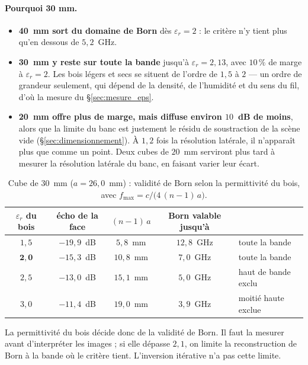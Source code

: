 \documentclass[11pt,a4paper]{article}
\newcommand{\eps}{\varepsilon_r}
\begin{document}
\paragraph{Pourquoi 30 mm.}
\begin{itemize}
\item \textbf{40~mm sort du domaine de Born} dès $\eps = 2$ : le critère n'y
      tient plus qu'en dessous de $5{,}2$~GHz.
\item \textbf{30~mm y reste sur toute la bande} jusqu'à $\eps = 2{,}13$, avec
      $10\,\%$ de marge à $\eps = 2$. Les bois légers et secs se situent de
      l'ordre de $1{,}5$ à $2$ --- un ordre de grandeur seulement, qui dépend de
      la densité, de l'humidité et du sens du fil, d'où la mesure du
      \S\ref{sec:mesure_eps}.
\item \textbf{20~mm offre plus de marge, mais diffuse environ $10$~dB de moins},
      alors que la limite du banc est justement le résidu de soustraction de la
      scène vide (\S\ref{sec:dimensionnement}). À $1{,}2$ fois la résolution
      latérale, il n'apparaît plus que comme un point. Deux cubes de $20$~mm
      serviront plus tard à mesurer la résolution latérale du banc, en faisant
      varier leur écart.
\end{itemize}

\begin{table}[H]
\centering
\begin{tabular}{ccccl}
\toprule
$\eps$ du bois & écho de la face & $(n-1)\,a$ & Born valable jusqu'à & \\
\midrule
$1{,}5$ & $-19{,}9$~dB & $5{,}8$~mm & $12{,}8$~GHz & toute la bande \\
$\mathbf{2{,}0}$ & $-15{,}3$~dB & $10{,}8$~mm & $7{,}0$~GHz & toute la bande \\
$2{,}5$ & $-13{,}0$~dB & $15{,}1$~mm & $5{,}0$~GHz & haut de bande exclu \\
$3{,}0$ & $-11{,}4$~dB & $19{,}0$~mm & $3{,}9$~GHz & moitié haute exclue \\
\bottomrule
\end{tabular}
\caption{Cube de $30$~mm ($a = 26{,}0$~mm) : validité de Born selon la
permittivité du bois, avec $f_{\max} = c/\bigl(4\,(n-1)\,a\bigr)$.}
\label{tab:bois}
\end{table}

La permittivité du bois décide donc de la validité de Born. Il faut la mesurer
avant d'interpréter les images ; si elle dépasse $2{,}1$, on limite la
reconstruction de Born à la bande où le critère tient. L'inversion itérative n'a
pas cette limite.
\end{document}
